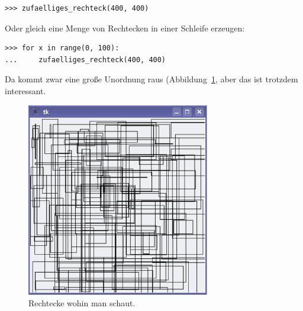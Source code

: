 \begin{Verbatim}[frame=single]
>>> zufaelliges_rechteck(400, 400)
\end{Verbatim}

\noindent
Oder gleich eine Menge von Rechtecken in einer Schleife erzeugen:

\begin{Verbatim}[frame=single]
>>> for x in range(0, 100):
...     zufaelliges_rechteck(400, 400)
\end{Verbatim}

\noindent
Da kommt zwar eine große Unordnung raus (Abbildung~\ref{fig34}, aber das ist trotzdem interessant.

\begin{figure}
\begin{center}
\includegraphics[width=80mm]{images/figure34}
\end{center}
\caption{Rechtecke wohin man schaut.}\label{fig34}
\end{figure}


